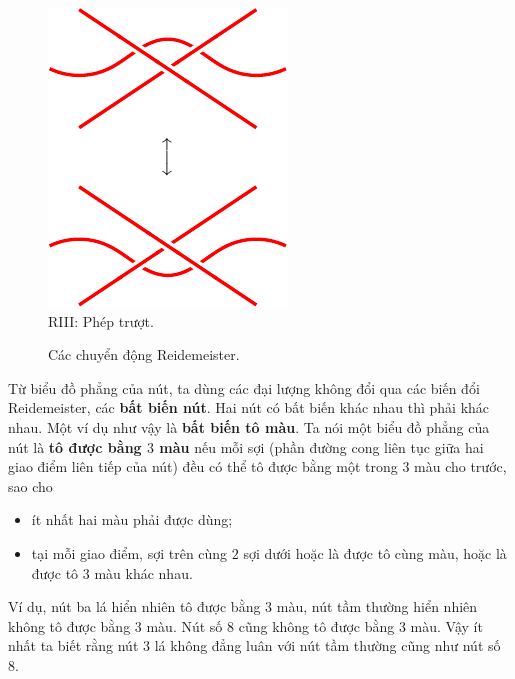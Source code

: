 \documentclass[12pt]{article}
\begin{document}
\begin{figure}[h!]
\begin{minipage}{0.48\textwidth}
        \centering
        \includegraphics{R3.pdf} \\
        RIII: Phép trượt.
    \end{minipage}
    \caption{Các chuyển động Reidemeister.}
    \label{h14}
\end{figure}

Từ biểu đồ phẳng của nút, ta dùng các đại lượng không đổi qua các biến đổi Reidemeister, các {\bf bất biến nút}. Hai nút có bất biến khác nhau thì phải khác nhau. Một ví dụ như vậy là {\bf bất biến tô màu}. Ta nói một biểu đồ phẳng của nút là {\bf tô được bằng $3$ màu} nếu mỗi sợi (phần đường cong liên tục giữa hai giao điểm liên tiếp của nút) đều có thể tô được bằng một trong $3$ màu cho trước, sao cho
    \begin{itemize}
        \item ít nhất hai màu phải được dùng;
        \item tại mỗi giao điểm, sợi trên cùng $2$ sợi dưới hoặc là được tô cùng màu, hoặc là được tô $3$ màu khác nhau.
    \end{itemize}
Ví dụ, nút ba lá hiển nhiên tô được bằng 3 màu, nút tầm thường hiển nhiên không tô được bằng 3 màu. Nút số 8 cũng không tô được bằng 3 màu. Vậy ít nhất ta biết rằng nút 3 lá không đẳng luân với nút tầm thường cũng như nút số 8.
\end{document}
